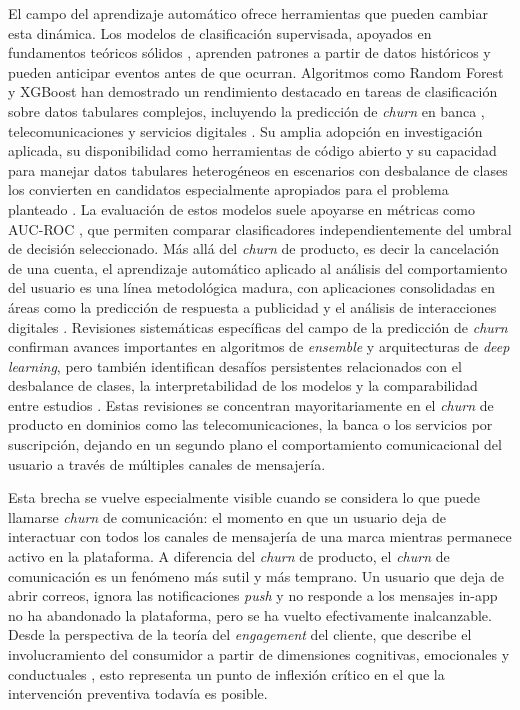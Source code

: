 \documentclass[11pt,a4paper]{article}
\begin{document}
El campo del aprendizaje automático ofrece herramientas que pueden cambiar
esta dinámica. Los modelos de clasificación supervisada, apoyados en
fundamentos teóricos sólidos \cite{hastie2009elements}, aprenden patrones
a partir de datos históricos y pueden anticipar eventos antes de que
ocurran. Algoritmos como Random Forest \cite{breiman2001random} y XGBoost
\cite{chen2016xgboost} han demostrado un rendimiento destacado en tareas
de clasificación sobre datos tabulares complejos, incluyendo la predicción
de \textit{churn} en banca \cite{brito2024framework},
telecomunicaciones \cite{barsotti2024decade,abdelhady2025leveraging} y
servicios digitales \cite{lalwani2022customer}. Su amplia adopción en
investigación aplicada, su disponibilidad como herramientas de código
abierto y su capacidad para manejar datos tabulares heterogéneos en
escenarios con desbalance de clases los convierten en candidatos
especialmente apropiados para el problema planteado
\cite{chen2016xgboost,hastie2009elements,brito2024framework,lalwani2022customer}.
La evaluación de estos modelos suele apoyarse en métricas como AUC-ROC
\cite{fawcett2006introduction}, que permiten comparar clasificadores
independientemente del umbral de decisión seleccionado. Más allá del
\textit{churn} de producto, es decir la cancelación de una cuenta, el
aprendizaje automático aplicado al análisis del comportamiento del
usuario es una línea metodológica madura, con aplicaciones consolidadas
en áreas como la predicción de respuesta a publicidad y el análisis
de interacciones digitales \cite{martin2021survey,gharibshah2022user}.
Revisiones sistemáticas específicas del campo de la predicción de
\textit{churn} confirman avances importantes en algoritmos de
\textit{ensemble} y arquitecturas de \textit{deep learning}, pero también
identifican desafíos persistentes relacionados con el desbalance de
clases, la interpretabilidad de los modelos y la comparabilidad entre
estudios \cite{imani2025customer,barsotti2024decade}. Estas revisiones
se concentran mayoritariamente en el \textit{churn} de producto en
dominios como las telecomunicaciones, la banca o los servicios por
suscripción, dejando en un segundo plano el comportamiento
comunicacional del usuario a través de múltiples canales de mensajería.

Esta brecha se vuelve especialmente visible cuando se considera lo que
puede llamarse \textit{churn} de comunicación: el momento en que un
usuario deja de interactuar con todos los canales de mensajería de una
marca mientras permanece activo en la plataforma. A diferencia del
\textit{churn} de producto, el \textit{churn} de comunicación es un
fenómeno más sutil y más temprano. Un usuario que deja de abrir correos,
ignora las notificaciones \textit{push} y no responde a los mensajes
in-app no ha abandonado la plataforma, pero se ha vuelto efectivamente
inalcanzable. Desde la perspectiva de la teoría del \textit{engagement}
del cliente, que describe el involucramiento del consumidor a partir de
dimensiones cognitivas, emocionales y conductuales
\cite{hollebeek2014consumer,hollebeek2019digital}, esto representa un
punto de inflexión crítico en el que la intervención preventiva todavía
es posible.
\end{document}
